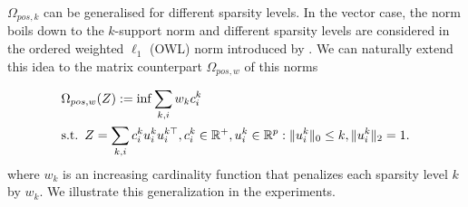 
%
%

$\Omega_{pos,k}$ can be generalised for different sparsity levels. In the vector case, the norm boils down to the $k$-support norm \citep{argyriou2012sparse} and different sparsity levels are considered in the ordered weighted $\ell_1$ (OWL) norm introduced by \citet{bogdan2013statistical}. We can naturally extend this idea to the matrix counterpart $\Omega_{pos,w}$ of this norms 

\begin{align*}
& \Omega_{pos,w}(Z):=\inf \sum_{k,i}w_{k}c_i^k  \\
& \text{s.t.} \enskip Z=\sum_{k,i} c_i^k u_i^k u_{i}^{k\top},c_i^k\in \mathbb{R}^{+}, u_{i}^k\in\mathbb{R}^p  :   \|u_{i}^k\|_0 \leq k, \|u_{i}^k\|_2 = 1.
\end{align*}
where $w_{k}$ is an increasing cardinality function that penalizes each sparsity level $k$ by $w_{k}$. We illustrate this generalization in the experiments.





